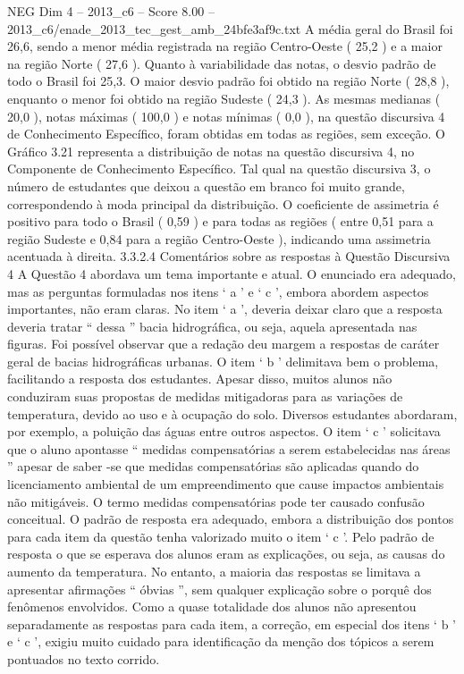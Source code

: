 \begin{textsample}{NEG Dim 4 – 2013\_c6 – Score 8.00 – 2013\_c6/enade\_2013\_tec\_gest\_amb\_24bfe3af9c.txt}
A média geral do Brasil foi 26,6, sendo a menor média registrada na região Centro-Oeste ( 25,2 ) e a maior na região Norte ( 27,6 ).
Quanto à variabilidade das notas, o desvio padrão de todo o Brasil foi 25,3.
O maior desvio padrão foi obtido na região Norte ( 28,8 ), enquanto o menor foi obtido na região Sudeste ( 24,3 ).
As mesmas medianas ( 20,0 ), notas máximas ( 100,0 ) e notas mínimas ( 0,0 ), na questão discursiva 4 de Conhecimento Específico, foram obtidas em todas as regiões, sem exceção.
O Gráfico 3.21 representa a distribuição de notas na questão discursiva 4, no Componente de Conhecimento Específico.
Tal qual na questão discursiva 3, o número de estudantes que deixou a questão em branco foi muito grande, correspondendo à moda principal da distribuição.
O coeficiente de assimetria é positivo para todo o Brasil ( 0,59 ) e para todas as regiões ( entre 0,51 para a região Sudeste e 0,84 para a região Centro-Oeste ), indicando uma assimetria acentuada à direita. 3.3.2.4 Comentários sobre as respostas à Questão Discursiva 4 A Questão 4 abordava um tema importante e atual.
O enunciado era adequado, mas as perguntas formuladas nos itens ‘ a ’ e ‘ c ’, embora abordem aspectos importantes, não eram claras.
No item ‘ a ’, deveria deixar claro que a resposta deveria tratar “ dessa ” bacia hidrográfica, ou seja, aquela apresentada nas figuras.
Foi possível observar que a redação deu margem a respostas de caráter geral de bacias hidrográficas urbanas.
O item ‘ b ’ delimitava bem o problema, facilitando a resposta dos estudantes.
Apesar disso, muitos alunos não conduziram suas propostas de medidas mitigadoras para as variações de temperatura, devido ao uso e à ocupação do solo.
Diversos estudantes abordaram, por exemplo, a poluição das águas entre outros aspectos.
O item ‘ c ’ solicitava que o aluno apontasse “ medidas compensatórias a serem estabelecidas nas áreas ” apesar de saber -se que medidas compensatórias são aplicadas quando do licenciamento ambiental de um empreendimento que cause impactos ambientais não mitigáveis.
O termo medidas compensatórias pode ter causado confusão conceitual.
O padrão de resposta era adequado, embora a distribuição dos pontos para cada item da questão tenha valorizado muito o item ‘ c ’.
Pelo padrão de resposta o que se esperava dos alunos eram as explicações, ou seja, as causas do aumento da temperatura.
No entanto, a maioria das respostas se limitava a apresentar afirmações “ óbvias ”, sem qualquer explicação sobre o porquê dos fenômenos envolvidos.
Como a quase totalidade dos alunos não apresentou separadamente as respostas para cada item, a correção, em especial dos itens ‘ b ’ e ‘ c ’, exigiu muito cuidado para identificação da menção dos tópicos a serem pontuados no texto corrido.

\end{textsample}
